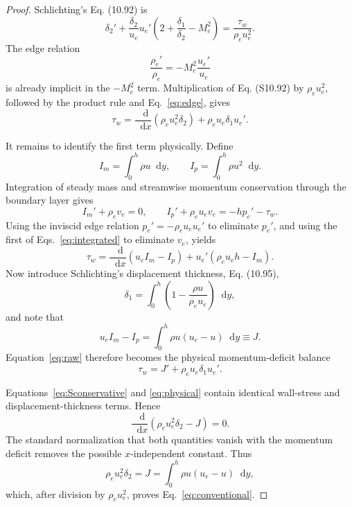 \documentclass[11pt,a4paper]{article}
\newcommand{\dd}{\mathop{}\!\mathrm{d}}
\newcommand{\rhoe}{\rho_e}
\newcommand{\ue}{u_e}
\newcommand{\taUw}{\tau_w}
\begin{document}
\begin{proof}
Schlichting's Eq. (10.92) is
\begin{equation*}
 \delta_2'
 +\frac{\delta_2}{\ue}\ue'
 \left(2+\frac{\delta_1}{\delta_2}-M_e^2\right)
 =\frac{\taUw}{\rhoe\ue^2}.
 \tag{S10.92}
\end{equation*}
The edge relation
\begin{equation}
 \frac{\rhoe'}{\rhoe}=-M_e^2\frac{\ue'}{\ue}
 \label{eq:edge}
\end{equation}
is already implicit in the $-M_e^2$ term. Multiplication of Eq. (S10.92) by
$\rhoe\ue^2$, followed by the product rule and Eq.~\eqref{eq:edge}, gives
\begin{equation}
 \boxed{\displaystyle
 \taUw=\frac{\dd}{\dd x}(\rhoe\ue^2\delta_2)
       +\rhoe\ue\delta_1\ue'.}
 \label{eq:Sconservative}
\end{equation}

It remains to identify the first term physically. Define
\[
 I_m=\int_0^h\rho u\dd y,
 \qquad
 I_p=\int_0^h\rho u^2\dd y.
\]
Integration of steady mass and streamwise momentum conservation through the
boundary layer gives
\begin{equation}
 I_m'+\rhoe v_e=0,
 \qquad
 I_p'+\rhoe\ue v_e=-h p_e'-\taUw.
 \label{eq:integrated}
\end{equation}
Using the inviscid edge relation $p_e'=-\rhoe\ue\ue'$ to eliminate $p_e'$, and
using the first of Eqs.~\eqref{eq:integrated} to eliminate $v_e$, yields
\begin{equation}
 \taUw=\frac{\dd}{\dd x}(\ue I_m-I_p)
       +\ue'(\rhoe\ue h-I_m).
 \label{eq:raw}
\end{equation}
Now introduce Schlichting's displacement thickness, Eq. (10.95),
\begin{equation}
 \delta_1=\int_0^h
 \left(1-\frac{\rho u}{\rhoe\ue}\right)\dd y,
 \label{eq:delta1}
\end{equation}
and note that
\begin{equation}
 \ue I_m-I_p
 =\int_0^h\rho u(\ue-u)\dd y\equiv J.
 \label{eq:J}
\end{equation}
Equation~\eqref{eq:raw} therefore becomes the physical momentum-deficit balance
\begin{equation}
 \boxed{\displaystyle
 \taUw=J'+\rhoe\ue\delta_1\ue'.}
 \label{eq:physical}
\end{equation}

Equations~\eqref{eq:Sconservative} and \eqref{eq:physical} contain identical
wall-stress and displacement-thickness terms. Hence
\begin{equation}
 \frac{\dd}{\dd x}(\rhoe\ue^2\delta_2-J)=0.
 \label{eq:comparison}
\end{equation}
The standard normalization that both quantities vanish with the momentum
deficit removes the possible $x$-independent constant. Thus
\[
 \rhoe\ue^2\delta_2=J
 =\int_0^h\rho u(\ue-u)\dd y,
\]
which, after division by $\rhoe\ue^2$, proves Eq.~\eqref{eq:conventional}.


\end{proof}
\end{document}

